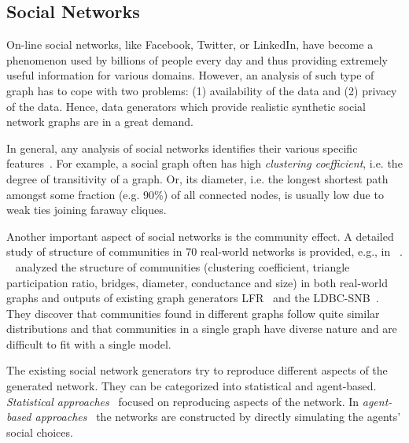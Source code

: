 \subsection{Social Networks}
\label{sec:generators_socialnetworks}

On-line social networks, like Facebook, Twitter, or LinkedIn, have become a
phenomenon used by billions of people every day and thus providing extremely
useful information for various domains. However, an analysis of such type of
graph has to cope with two problems: (1) availability of the data and (2)
privacy of the data. Hence, data generators which provide realistic synthetic
social network graphs are in a great demand.

In general, any analysis of social networks identifies their various specific
features~\cite{Chakrabarti:2006:GML:1132952.1132954}. For example, a social
graph often has high \emph{clustering coefficient}, i.e. the degree of transitivity of
a graph. Or, its diameter, i.e. the longest shortest path amongst some fraction (e.g. 90\%) of all connected nodes, is usually low due to weak ties joining faraway cliques.

Another important aspect
of social networks is the community effect. A detailed study of structure of
communities in 70 real-world networks is provided, e.g., in
~\cite{Leskovec:2008:SPC:1367497.1367591}.
~\cite{Prat-Perez:2014:CSS:2621934.2621942} analyzed the structure of
communities (clustering coefficient, triangle participation ratio, bridges,
diameter, conductance and size) in both real-world graphs and outputs of existing graph
generators LFR~\cite{PhysRevE.78.046110} and the
LDBC-SNB~\cite{Erling:2015:LSN:2723372.2742786}. They discover that communities found in different graphs follow quite similar distributions and that communities in a single graph have diverse nature and are difficult to fit with a single model.

The existing social network generators try to reproduce different aspects of the
generated network. They can be categorized into statistical and agent-based.
\emph{Statistical
approaches}~\cite{PhysRevE.78.046110,Yao2011,Armstrong:2013:LDB:2463676.2465296,Pham2013,Sukthankar-SocialInfo2014,Erling:2015:LSN:2723372.2742786,Nettleton2016}
focused on reproducing aspects of the network. In \emph{agent-based
approaches}~\cite{Barrett:2009:GAL:1995456.1995598,Bernstein:2013:SAS:2499604.2499609}
the networks are constructed by directly simulating the agents' social choices.


